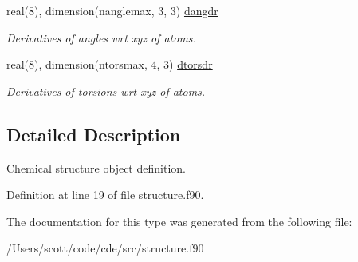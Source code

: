 \begin{DoxyCompactItemize}
\mbox{\label{structchemstr_1_1cxs_a09576e755557f8a6196897d1da5e2e9b}} 
real(8), dimension(nanglemax, 3, 3) \mbox{\hyperlink{structchemstr_1_1cxs_a09576e755557f8a6196897d1da5e2e9b}{dangdr}}
\begin{DoxyCompactList}\small\item\em Derivatives of angles wrt xyz of atoms. \end{DoxyCompactList}\item 
\mbox{\label{structchemstr_1_1cxs_ab5ab71029fac772aa9a7e6ce98a2e92a}} 
real(8), dimension(ntorsmax, 4, 3) \mbox{\hyperlink{structchemstr_1_1cxs_ab5ab71029fac772aa9a7e6ce98a2e92a}{dtorsdr}}
\begin{DoxyCompactList}\small\item\em Derivatives of torsions wrt xyz of atoms. \end{DoxyCompactList}\end{DoxyCompactItemize}


\subsection{Detailed Description}
Chemical structure object definition. 

Definition at line 19 of file structure.\+f90.



The documentation for this type was generated from the following file\+:\begin{DoxyCompactItemize}
\item 
/\+Users/scott/code/cde/src/structure.\+f90\end{DoxyCompactItemize}
